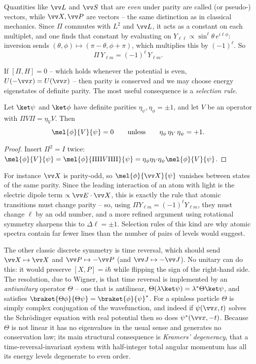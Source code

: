 Quantities like $\vv L$ and $\vv S$ that are \emph{even} under parity are called  (or pseudo-) vectors, while $\vv X, \vv P$ are  vectors -- the same distinction as in classical mechanics. Since $\Pi$ commutes with $L^2$ and $\vv L$, it acts as a constant on each multiplet, and one finds that constant by evaluating on $Y_{\ell\ell}\propto \sin^\ell\theta\, e^{i\ell\phi}$: inversion sends $(\theta,\phi)\mapsto(\pi-\theta,\phi+\pi)$, which multiplies this by $(-1)^\ell$. So
$$
\Pi \, Y_{\ell m} = (-1)^\ell \, Y_{\ell m}.
$$

If $[\Pi, H] = 0$ -- which holds whenever the potential is even, $U(-\vv x) = U(\vv x)$ -- then parity is conserved and we may choose energy eigenstates of definite parity. The most useful consequence is a \emph{selection rule}.

\begin{proposition}
    Let $\ket\psi$ and $\ket\phi$ have definite parities $\eta_\psi, \eta_\phi = \pm1$, and let $V$ be an operator with $\Pi V \Pi = \eta_V V$. Then
    $$
    \mel{\phi}{V}{\psi} = 0 \qquad \text{unless} \qquad \eta_\phi\, \eta_V\, \eta_\psi = +1.
    $$
\end{proposition}
\begin{proof}
    Insert $\Pi^2 = I$ twice: $\mel{\phi}{V}{\psi} = \mel{\phi}{\Pi \Pi V \Pi \Pi}{\psi} = \eta_\phi \eta_V \eta_\psi \mel{\phi}{V}{\psi}$.
\end{proof}

For instance $\vv X$ is parity-odd, so $\mel{\phi}{\vv X}{\psi}$ vanishes between states of the same parity. Since the leading interaction of an atom with light is the electric dipole term $\propto \vv E \cdot \vv X$, this is exactly the rule that atomic transitions must change parity -- so, using $\Pi Y_{\ell m} = (-1)^\ell Y_{\ell m}$, they must change $\ell$ by an odd number, and a more refined argument using rotational symmetry sharpens this to $\Delta \ell = \pm1$. Selection rules of this kind are why atomic spectra contain far fewer lines than the number of pairs of levels would suggest.

\begin{remark}
    The other classic discrete symmetry is time reversal, which should send $\vv X \mapsto \vv X$ and $\vv P \mapsto -\vv P$ (and $\vv J \mapsto -\vv J$). No unitary can do this: it would preserve $[X,P] = i\hbar$ while flipping the sign of the right-hand side. The resolution, due to Wigner, is that time reversal is implemented by an \emph{antiunitary} operator $\Theta$ -- one that is antilinear, $\Theta(\lambda\ket\psi) = \lambda^*\Theta\ket\psi$, and satisfies $\braket{\Theta\phi}{\Theta\psi} = \braket{\phi}{\psi}^*$. For a spinless particle $\Theta$ is simply complex conjugation of the wavefunction, and indeed if $\psi(\vv x, t)$ solves the Schr\"odinger equation with real potential then so does $\psi^*(\vv x, -t)$. Because $\Theta$ is not linear it has no eigenvalues in the usual sense and generates no conservation law; its main structural consequence is \emph{Kramers' degeneracy}, that a time-reversal-invariant system with half-integer total angular momentum has all its energy levels degenerate to even order.
\end{remark}

